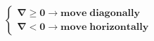 \documentclass[preview]{standalone}
\begin{document}
\begin{center}
$\boxed{\boldsymbol{\begin{cases}\nabla\ge0\rightarrow move\;diagonally\\\nabla<0\rightarrow move\;horizontally\end{cases}}}$
\end{center}
\end{document}
